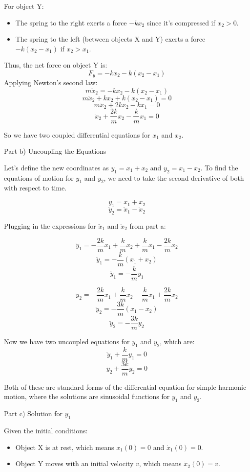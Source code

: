 \documentclass[a4paper,11pt]{article}
\begin{document}
For object Y:

\begin{itemize}
  \item The spring to the right exerts a force \( -kx_2 \) since it's compressed if \( x_2 > 0 \).
  \item The spring to the left (between objects X and Y) exerts a force \( -k(x_2 - x_1) \) if \( x_2 > x_1 \).
\end{itemize}

Thus, the net force on object Y is:
\[ F_y = -kx_2 - k(x_2 - x_1) \]
Applying Newton's second law:
\[ m\ddot{x}_2 = -kx_2 - k(x_2 - x_1) \]
\[ m\ddot{x}_2 + kx_2 + k(x_2 - x_1) = 0 \]
\[ m\ddot{x}_2 + 2kx_2 - kx_1 = 0 \]
\[ \ddot{x}_2 + \frac{2k}{m}x_2 - \frac{k}{m}x_1 = 0 \]

So we have two coupled differential equations for \( x_1 \) and \( x_2 \).

Part b) Uncoupling the Equations

Let's define the new coordinates as \( y_1 = x_1 + x_2 \) and \( y_2 = x_1 - x_2 \). To find the equations of motion for \( y_1 \) and \( y_2 \), we need to take the second derivative of both with respect to time.

\[ \ddot{y}_1 = \ddot{x}_1 + \ddot{x}_2 \]
\[ \ddot{y}_2 = \ddot{x}_1 - \ddot{x}_2 \]

Plugging in the expressions for \( \ddot{x}_1 \) and \( \ddot{x}_2 \) from part a:

\[ \ddot{y}_1 = -\frac{2k}{m}x_1 + \frac{k}{m}x_2 + \frac{k}{m}x_1 - \frac{2k}{m}x_2 \]
\[ \ddot{y}_1 = -\frac{k}{m}(x_1 + x_2) \]
\[ \ddot{y}_1 = -\frac{k}{m}y_1 \]

\[ \ddot{y}_2 = -\frac{2k}{m}x_1 + \frac{k}{m}x_2 - \frac{k}{m}x_1 + \frac{2k}{m}x_2 \]
\[ \ddot{y}_2 = -\frac{3k}{m}(x_1 - x_2) \]
\[ \ddot{y}_2 = -\frac{3k}{m}y_2 \]

Now we have two uncoupled equations for \( y_1 \) and \( y_2 \), which are:
\[ \ddot{y}_1 + \frac{k}{m}y_1 = 0 \]
\[ \ddot{y}_2 + \frac{3k}{m}y_2 = 0 \]

Both of these are standard forms of the differential equation for simple harmonic motion, where the solutions are sinusoidal functions for \( y_1 \) and \( y_2 \).

Part c) Solution for \( y_1 \)

Given the initial conditions:
\begin{itemize}
  \item Object X is at rest, which means \( x_1(0) = 0 \) and \( \dot{x}_1(0) = 0 \).
  \item Object Y moves with an initial velocity \( v \), which means \( \dot{x}_2(0) = v \).
\end{itemize}
\end{document}
